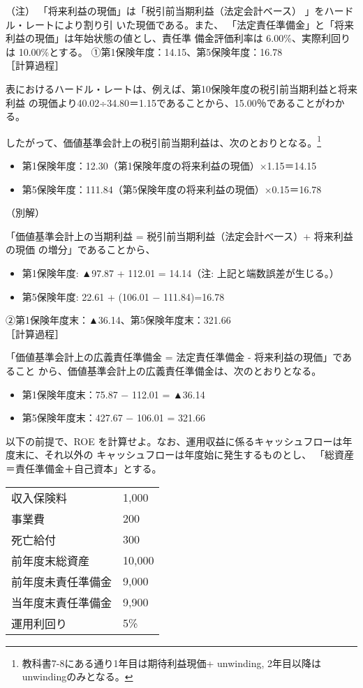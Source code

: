 \documentclass[report,gutter=10mm,fore-edge=10mm,uplatex,dvipdfmx]{jlreq}
\begin{document}
（注）
「将来利益の現価」は「税引前当期利益（法定会計ベース）
」をハードル・レートにより割り引
いた現価である。また、
「法定責任準備金」と「将来利益の現価」は年始状態の値とし、責任準
備金評価利率は 6.00\%、実際利回りは 10.00\%とする。
\answer{}
①第1保険年度：14.15、第5保険年度：16.78\\
［計算過程］

表におけるハードル・レートは、例えば、第10保険年度の税引前当期利益と将来利益
の現価より40.02÷34.80＝1.15であることから、15.00％であることがわかる。

したがって、価値基準会計上の税引前当期利益は、次のとおりとなる。\footnote{教科書7-8にある通り1年目は期待利益現価+ unwinding, 2年目以降は unwindingのみとなる。}
\begin{itemize}
\item[]  第1保険年度：12.30（第1保険年度の将来利益の現価）×1.15＝14.15
\item[]  第5保険年度：111.84（第5保険年度の将来利益の現価）×0.15＝16.78
\end{itemize}
（別解）

「価値基準会計上の当期利益 = 税引前当期利益（法定会計べ一ス）+ 将来利益の現価
の増分」であることから、
\begin{itemize}
\item[]  第1保険年度: ▲97.87 + 112.01 = 14.14（注: 上記と端数誤差が生じる。）
\item[]  第5保険年度: 22.61  + (106.01 − 111.84)=16.78
\end{itemize}

②第1保険年度末：▲36.14、第5保険年度末：321.66\\
［計算過程］

「価値基準会計上の広義責任準備金 = 法定責任準備金 - 将来利益の現価」であること
から、価値基準会計上の広義責任準備金は、次のとおりとなる。
\begin{itemize}
\item[] 第1保険年度末：75.87  −  112.01 = ▲36.14
\item[] 第5保険年度末：427.67 − 106.01 = 321.66
\end{itemize}




以下の前提で、ROE を計算せよ。なお、運用収益に係るキャッシュフローは年度末に、それ以外の
キャッシュフローは年度始に発生するものとし、
「総資産＝責任準備金＋自己資本」とする。

\begin{tabular}{ll}
 収入保険料&1,000\\
 事業費&200\\
 死亡給付&300\\
 前年度末総資産&10,000\\
 前年度未責任準備金 &9,000\\
 当年度末責任準備金 &9,900\\
 運用利回り&5\%
\end{tabular}
\end{document}

